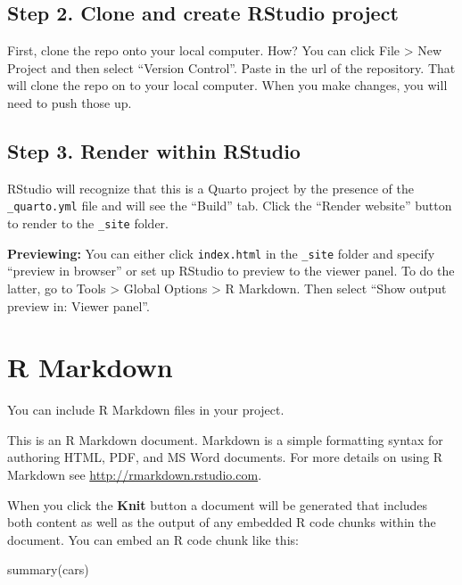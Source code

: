 \documentclass[
  11pt,
  letterpaper,
  oneside,
  open=any]{scrbook}
\newenvironment{Shaded}{\begin{snugshade}}{\end{snugshade}}
\newcommand{\FunctionTok}[1]{\textcolor[rgb]{0.28,0.35,0.67}{#1}}
\newcommand{\NormalTok}[1]{\textcolor[rgb]{0.00,0.23,0.31}{#1}}
\begin{document}
\hypertarget{step-2.-clone-and-create-rstudio-project}{%
\section{Step 2. Clone and create RStudio
project}\label{step-2.-clone-and-create-rstudio-project}}

First, clone the repo onto your local computer. How? You can click File
\textgreater{} New Project and then select ``Version Control''. Paste in
the url of the repository. That will clone the repo on to your local
computer. When you make changes, you will need to push those up.

\hypertarget{step-3.-render-within-rstudio}{%
\section{Step 3. Render within
RStudio}\label{step-3.-render-within-rstudio}}

RStudio will recognize that this is a Quarto project by the presence of
the \texttt{\_quarto.yml} file and will see the ``Build'' tab. Click the
``Render website'' button to render to the \texttt{\_site} folder.

\textbf{Previewing:} You can either click \texttt{index.html} in the
\texttt{\_site} folder and specify ``preview in browser'' or set up
RStudio to preview to the viewer panel. To do the latter, go to Tools
\textgreater{} Global Options \textgreater{} R Markdown. Then select
``Show output preview in: Viewer panel''.


\hypertarget{r-markdown}{%
\chapter{R Markdown}\label{r-markdown}}

You can include R Markdown files in your project.

This is an R Markdown document. Markdown is a simple formatting syntax
for authoring HTML, PDF, and MS Word documents. For more details on
using R Markdown see \url{http://rmarkdown.rstudio.com}.

When you click the \textbf{Knit} button a document will be generated
that includes both content as well as the output of any embedded R code
chunks within the document. You can embed an R code chunk like this:

\begin{Shaded}
\begin{Highlighting}[]
\FunctionTok{summary}\NormalTok{(cars)}
\end{Highlighting}
\end{Shaded}
\end{document}
